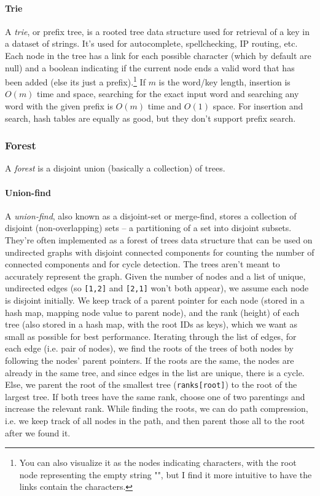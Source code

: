 \documentclass[8pt, table, xcdraw]{article}%
\begin{document}
\paragraph{Trie}

A \emph{trie}, or prefix tree, is a rooted tree data structure used for retrieval of a key in a dataset of strings. It's used for autocomplete, spellchecking, IP routing, etc. Each node in the tree has a link for each possible character (which by default are null) and a boolean indicating if the current node ends a valid word that has been added (else its just a prefix).\footnote{You can also visualize it as the nodes indicating characters, with the root node representing the empty string "", but I find it more intuitive to have the links contain the characters.} If $m$ is the word/key length, insertion is $O(m)$ time and space, searching for the exact input word and searching any word with the given prefix is $O(m)$ time and $O(1)$ space. For insertion and search, hash tables are equally as good, but they don't support prefix search.

\subsubsection{Forest}

A \emph{forest} is a disjoint union (basically a collection) of trees.

\paragraph{Union-find}

A \emph{union-find}, also known as a disjoint-set or merge-find, stores a collection of disjoint (non-overlapping) sets -- a partitioning of a set into disjoint subsets. They're often implemented as a forest of trees data structure that can be used on undirected graphs with disjoint connected components for counting the number of connected components and for cycle detection. The trees aren't meant to accurately represent the graph. Given the number of nodes and a list of unique, undirected edges (so \lstinline{[1,2]} and \lstinline{[2,1]} won't both appear), we assume each node is disjoint initially. We keep track of a parent pointer for each node (stored in a hash map, mapping node value to parent node), and the rank (height) of each tree (also stored in a hash map, with the root IDs as keys), which we want as small as possible for best performance. Iterating through the list of edges, for each edge (i.e. pair of nodes), we find the roots of the trees of both nodes by following the nodes' parent pointers. If the roots are the same, the nodes are already in the same tree, and since edges in the list are unique, there is a cycle. Else, we parent the root of the smallest tree (\lstinline{ranks[root]}) to the root of the largest tree. If both trees have the same rank, choose one of two parentings and increase the relevant rank. While finding the roots, we can do path compression, i.e. we keep track of all nodes in the path, and then parent those all to the root after we found it.
\end{document}
